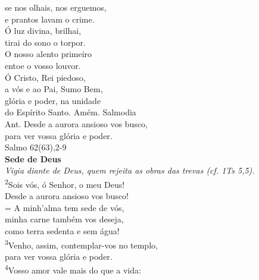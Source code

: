 \documentclass{book}
\begin{document}
\begin{center}
    se nos olhais, nos erguemos, \\
    e prantos lavam o crime.
    \vspace{.2cm} \\
    Ó luz divina, brilhai, \\
    tirai do sono o torpor. \\
    O nosso alento primeiro \\
    entoe o vosso louvor.
    \vspace{.2cm} \\
    Ó Cristo, Rei piedoso, \\
    a vós e ao Pai, Sumo Bem, \\
    glória e poder, na unidade \\
    do Espírito Santo. Amém.
    \newpage
    \textcolor{VioletRed2}{Salmodia}
    \vspace{.2cm} \\
    \textcolor{VioletRed2}{Ant.} Desde a aurora ansioso vos busco, \\
    para ver vossa glória e poder.
    \vspace{.2cm} \\
    \textcolor{VioletRed2}{Salmo 62(63),2-9}
    \vspace{.2cm} \\
    \textbf{Sede de Deus} \\
    \textit{Vigia diante de Deus, quem rejeita as obras das trevas (cf. 1Ts 5,5).}
    \vspace{.2cm} \\
    \textsuperscript{\underline{\hspace{.06in}}\textcolor{VioletRed2}{2}}Sois vós, ó Senhor, o meu Deus! \textsuperscript{\gresixstar{}} \\
    Desde a aurora ansioso vos busco! \\
    = A minh'alma tem sede de vós, \dag{} \\
    minha carne também vos deseja, \textsuperscript{\gresixstar{}} \\
    como terra sedenta e sem água!
    \vspace{.2cm} \\
    \textsuperscript{\underline{\hspace{.06in}}\textcolor{VioletRed2}{3}}Venho, assim, contemplar-vos no templo, \textsuperscript{\gresixstar{}} \\
    para ver vossa glória e poder. \\
    \textsuperscript{\underline{\hspace{.06in}}\textcolor{VioletRed2}{4}}Vosso amor vale mais do que a vida: \textsuperscript{\gresixstar{}} \\

\end{center}
\end{document}
